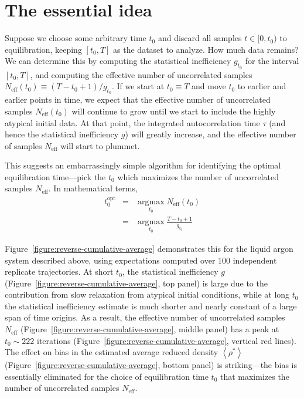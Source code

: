 \documentclass[aps,pre,twocolumn,nofootinbib,superscriptaddress,linenumbers,11point]{revtex4-1}
\DeclareMathOperator*{\argmax}{argmax}
\newcommand*{\argmaxl}{\argmax\limits}
\begin{document}
\section*{The essential idea}
\label{section:the-idea}

Suppose we choose some arbitrary time $t_0$ and discard all samples $t \in [0, t_0)$ to equilibration, keeping $[t_0, T]$ as the dataset to analyze.
How much data remains?
We can determine this by computing the statistical inefficiency $g_{t_0}$ for the interval $[t_0, T]$, and computing the effective number of uncorrelated samples $N_\mathrm{eff}(t_0) \equiv (T - t_0 + 1) / g_{t_0}$.
If we start at $t_0 \equiv T$ and move $t_0$ to earlier and earlier points in time, we expect that the effective number of uncorrelated samples $N_\mathrm{eff}(t_0)$ will continue to grow until we start to include the highly atypical initial data.
At that point, the integrated autocorrelation time $\tau$ (and hence the statistical inefficiency $g$) will greatly increase, and the effective number of samples $N_\mathrm{eff}$ will start to plummet.

This suggests an embarrassingly simple algorithm for identifying the optimal equilibration time---pick the $t_0$ which maximizes the number of uncorrelated samples $N_\mathrm{eff}$.
In mathematical terms, 
\begin{eqnarray}
t_0^\mathrm{opt} &=& \argmaxl_{t_0} N_\mathrm{eff}(t_0) \label{equation:optimal-equilibration-time} \\
&=& \argmaxl_{t_0}  \frac{T - t_0 + 1}{g_{t_0}}
\end{eqnarray}

Figure~\ref{figure:reverse-cumulative-average} demonstrates this for the liquid argon system described above, using expectations computed over 100 independent replicate trajectories.
At short $t_0$, the statistical inefficiency $g$ (Figure~\ref{figure:reverse-cumulative-average}, top panel) is large due to the contribution from slow relaxation from atypical initial conditions, while at long $t_0$ the statistical inefficiency estimate is much shorter and nearly constant of a large span of time origins.
As a result, the effective number of uncorrelated samples $N_\mathrm{eff}$ (Figure~\ref{figure:reverse-cumulative-average}, middle panel) has a peak at $t_0 \sim 222$ iterations (Figure~\ref{figure:reverse-cumulative-average}, vertical red lines).
The effect on bias in the estimated average reduced density $\left\langle \rho^* \right\rangle$ (Figure~\ref{figure:reverse-cumulative-average}, bottom panel) is striking---the bias is essentially eliminated for the choice of equilibration time $t_0$ that maximizes the number of uncorrelated samples $N_\mathrm{eff}$.
\end{document}
